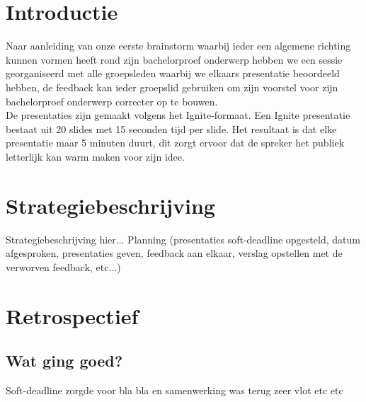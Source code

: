\documentclass[fleqn,10pt]{voorstel}
\begin{document}
\flushbottom %

\maketitle %

\tableofcontents %

\thispagestyle{empty} %


\section{Introductie} %
Naar aanleiding van onze eerste brainstorm waarbij ieder een algemene richting kunnen vormen heeft rond zijn bachelorproef onderwerp hebben we een sessie georganiseerd met alle groepsleden waarbij we elkaars presentatie beoordeeld hebben, de feedback kan ieder groepslid gebruiken om zijn voorstel voor zijn bachelorproef onderwerp correcter op te bouwen.\\
De presentaties zijn gemaakt volgens het Ignite-formaat. Een Ignite presentatie bestaat uit 20 slides met 15 seconden tijd per slide. Het resultaat is dat elke presentatie maar 5 minuten duurt, dit zorgt ervoor dat de spreker het publiek letterlijk kan warm maken voor zijn idee.

\section{Strategiebeschrijving}
Strategiebeschrijving hier...
Planning (presentaties soft-deadline opgesteld, datum afgesproken, presentaties geven, feedback aan elkaar, verslag opstellen met de verworven feedback, etc...)

\section{Retrospectief}
\subsection{Wat ging goed?}
Soft-deadline zorgde voor bla bla en samenwerking was terug zeer vlot etc etc
\end{document}
